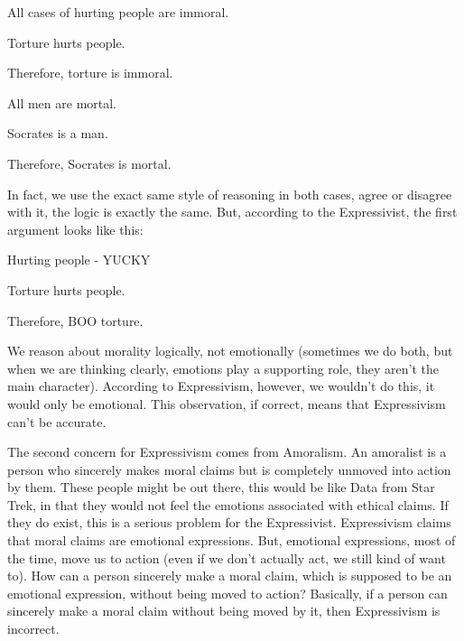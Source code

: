     \begin{earg}
    \item[]All cases of hurting people are immoral.
    \item[]Torture hurts people.
    \item[]Therefore, torture is immoral.
   \end{earg}

\begin{earg}
    \item[]All men are mortal.
    \item[]Socrates is a man.
    \item[]Therefore, Socrates is mortal.
\end{earg}

In fact, we use the exact same style of reasoning in both cases, agree or disagree with it, the logic is exactly the same. But, according to the Expressivist, the first argument looks like this:
\begin{earg}
    \item[]Hurting people - YUCKY
    \item[]Torture hurts people.
    \item[]Therefore, BOO torture. 
\end{earg}
We reason about morality logically, not emotionally (sometimes we do both, but when we are thinking clearly, emotions play a supporting role, they aren't the main character). According to Expressivism, however, we wouldn't do this, it would only be emotional. This observation, if correct, means that Expressivism can't be accurate. 

The second concern for Expressivism comes from Amoralism. An amoralist is a person who sincerely makes moral claims but is completely unmoved into action by them. These people might be out there, this would be like Data from Star Trek, in that they would not feel the emotions associated with ethical claims. If they do exist, this is a serious problem for the Expressivist. Expressivism claims that moral claims are emotional expressions. But, emotional expressions, most of the time, move us to action (even if we don’t actually act, we still kind of want to). How can a person sincerely make a moral claim, which is supposed to be an emotional expression, without being moved to action?  Basically, if a person can sincerely make a moral claim without being moved by it, then Expressivism is incorrect. 

